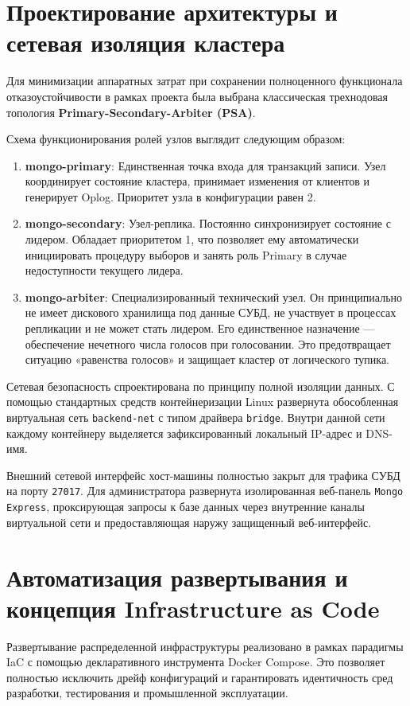 \documentclass[a4paper,14pt]{extarticle}
\begin{document}
	\newpage
	
	\section{Проектирование архитектуры и сетевая изоляция кластера}
	Для минимизации аппаратных затрат при сохранении полноценного функционала отказоустойчивости в рамках проекта была выбрана классическая трехнодовая топология \textbf{Primary-Secondary-Arbiter (PSA)}. 
	
	Схема функционирования ролей узлов выглядит следующим образом:
	\begin{enumerate}
		\item \textbf{mongo-primary}: Единственная точка входа для транзакций записи. Узел координирует состояние кластера, принимает изменения от клиентов и генерирует Oplog. Приоритет узла в конфигурации равен 2.
		\item \textbf{mongo-secondary}: Узел-реплика. Постоянно синхронизирует состояние с лидером. Обладает приоритетом 1, что позволяет ему автоматически инициировать процедуру выборов и занять роль Primary в случае недоступности текущего лидера.
		\item \textbf{mongo-arbiter}: Специализированный технический узел. Он принципиально не имеет дискового хранилища под данные СУБД, не участвует в процессах репликации и не может стать лидером. Его единственное назначение — обеспечение нечетного числа голосов при голосовании. Это предотвращает ситуацию «равенства голосов» и защищает кластер от логического тупика.
	\end{enumerate}
	
	Сетевая безопасность спроектирована по принципу полной изоляции данных. С помощью стандартных средств контейнеризации Linux развернута обособленная виртуальная сеть \texttt{backend-net} с типом драйвера \texttt{bridge}. Внутри данной сети каждому контейнеру выделяется зафиксированный локальный IP-адрес и DNS-имя. 
	
	Внешний сетевой интерфейс хост-машины полностью закрыт для трафика СУБД на порту \texttt{27017}. Для администратора развернута изолированная веб-панель \texttt{Mongo Express}, проксирующая запросы к базе данных через внутренние каналы виртуальной сети и предоставляющая наружу защищенный веб-интерфейс.
	
	\newpage
	
	\section{Автоматизация развертывания и концепция Infrastructure as Code}
	Развертывание распределенной инфраструктуры реализовано в рамках парадигмы IaC с помощью декларативного инструмента Docker Compose. Это позволяет полностью исключить дрейф конфигураций и гарантировать идентичность сред разработки, тестирования и промышленной эксплуатации.
	
\end{document}
